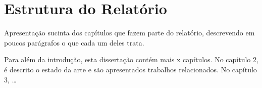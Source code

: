 \section{Estrutura do Relat\'orio} %
\label{sec:estrutura}

Apresentação sucinta dos capítulos que fazem parte do relatório, descrevendo em poucos parágrafos o que cada um deles trata.

Para além da introdução, esta dissertação contém mais x capítulos. No capítulo 2, é descrito o estado da arte e são apresentados trabalhos relacionados. No capítulo 3, \ldots

